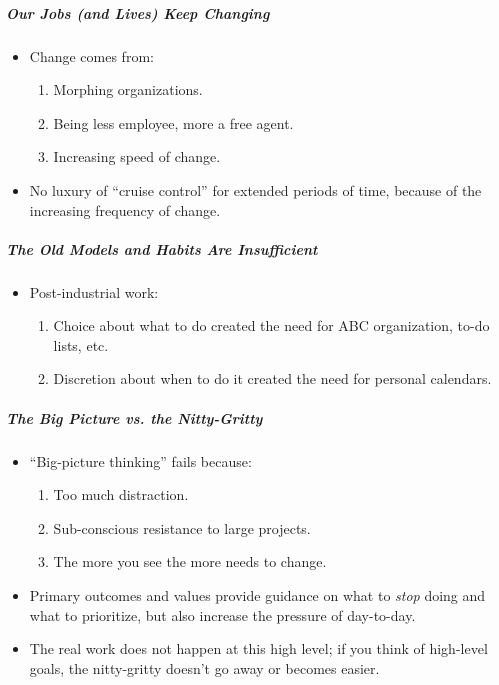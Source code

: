 \documentclass{article}
\begin{document}
\subparagraph{Our Jobs (and Lives) Keep Changing}

\begin{itemize}
  \item Change comes from:
  \begin{enumerate}
      \item Morphing organizations.
      \item Being less employee, more a free agent.
      \item Increasing speed of change.
  \end{enumerate}
  \item No luxury of ``cruise control'' for extended periods of time, because of the increasing frequency of change.
\end{itemize}

\subparagraph{The Old Models and Habits Are Insufficient}

\begin{itemize}
  \item Post-industrial work:
  \begin{enumerate}
      \item Choice about what to do created the need for ABC organization, to-do lists, etc.
      \item Discretion about when to do it created the need for personal calendars.
  \end{enumerate}
\end{itemize}

\subparagraph{The Big Picture vs. the Nitty-Gritty}

\begin{itemize}
  \item ``Big-picture thinking'' fails because:
  \begin{enumerate}
      \item Too much distraction.
      \item Sub-conscious resistance to large projects.
      \item The more you see the more needs to change.
  \end{enumerate}
  \item Primary outcomes and values provide guidance on what to \emph{stop} doing and what to prioritize, but also increase the pressure of day-to-day.
  \item The real work does not happen at this high level; if you think of high-level goals, the nitty-gritty doesn't go away or becomes easier.
\end{itemize}
\end{document}
